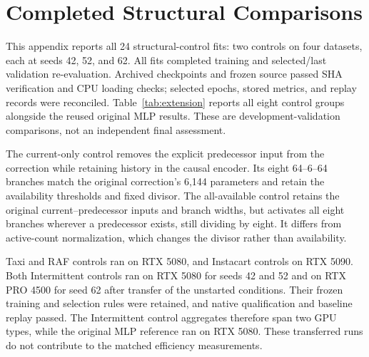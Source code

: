 \documentclass[runningheads]{llncs}
\begin{document}
\appendix
\section{Completed Structural Comparisons}\label{app:extension}
This appendix reports all 24 structural-control fits: two controls on four
datasets, each at seeds 42, 52, and 62. All fits completed training and
selected/last validation re-evaluation. Archived checkpoints and frozen
source passed SHA verification and CPU loading checks; selected epochs,
stored metrics, and replay records were reconciled. Table~\ref{tab:extension}
reports all eight control groups alongside the reused original MLP results.
These are development-validation comparisons, not an independent final
assessment.

The current-only control removes the explicit predecessor input from the
correction while retaining history in the causal encoder. Its eight
64--6--64 branches match the original correction's 6,144 parameters and
retain the availability thresholds and fixed divisor. The all-available
control retains the original current--predecessor inputs and branch widths,
but activates all eight branches wherever a predecessor exists, still
dividing by eight. It differs from active-count normalization, which changes
the divisor rather than availability.

Taxi and RAF controls ran on RTX 5080, and Instacart controls on RTX 5090.
Both Intermittent controls ran on RTX 5080 for seeds 42 and 52 and on RTX
PRO 4500 for seed 62 after transfer of the unstarted conditions. Their frozen
training and selection rules were retained, and native qualification and
baseline replay passed. The Intermittent control aggregates therefore span
two GPU types, while the original MLP reference ran on RTX 5080. These
transferred runs do not contribute to the matched efficiency measurements.
\end{document}
